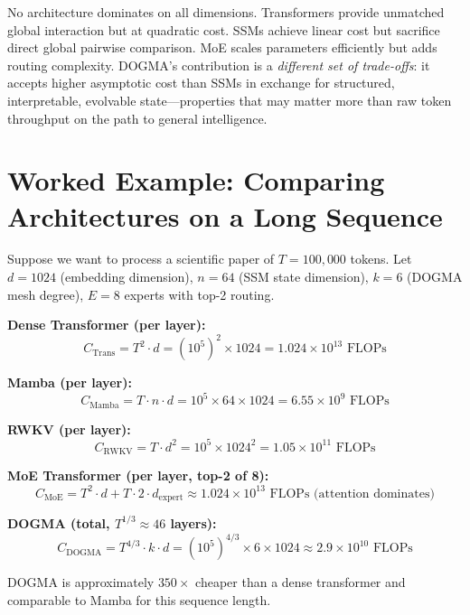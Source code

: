 \begin{keyinsight}
No architecture dominates on all dimensions. Transformers provide unmatched global interaction but at quadratic cost. SSMs achieve linear cost but sacrifice direct global pairwise comparison. MoE scales parameters efficiently but adds routing complexity. DOGMA's contribution is a \emph{different set of trade-offs}: it accepts higher asymptotic cost than SSMs in exchange for structured, interpretable, evolvable state---properties that may matter more than raw token throughput on the path to general intelligence.
\end{keyinsight}

\section{Worked Example: Comparing Architectures on a Long Sequence}
\label{sec:scaling-worked-example}

\begin{example}
Suppose we want to process a scientific paper of $T = 100{,}000$ tokens. Let $d = 1024$ (embedding dimension), $n = 64$ (SSM state dimension), $k = 6$ (DOGMA mesh degree), $E = 8$ experts with top-2 routing.

\textbf{Dense Transformer (per layer):}
\[
C_{\text{Trans}} = T^2 \cdot d = (10^5)^2 \times 1024 = 1.024 \times 10^{13} \text{ FLOPs}
\]

\textbf{Mamba (per layer):}
\[
C_{\text{Mamba}} = T \cdot n \cdot d = 10^5 \times 64 \times 1024 = 6.55 \times 10^9 \text{ FLOPs}
\]

\textbf{RWKV (per layer):}
\[
C_{\text{RWKV}} = T \cdot d^2 = 10^5 \times 1024^2 = 1.05 \times 10^{11} \text{ FLOPs}
\]

\textbf{MoE Transformer (per layer, top-2 of 8):}
\[
C_{\text{MoE}} = T^2 \cdot d + T \cdot 2 \cdot d_{\text{expert}} \approx 1.024 \times 10^{13} \text{ FLOPs (attention dominates)}
\]

\textbf{DOGMA (total, $T^{1/3} \approx 46$ layers):}
\[
C_{\text{DOGMA}} = T^{4/3} \cdot k \cdot d = (10^5)^{4/3} \times 6 \times 1024 \approx 2.9 \times 10^{10} \text{ FLOPs}
\]

DOGMA is approximately $350\times$ cheaper than a dense transformer and comparable to Mamba for this sequence length.
\end{example}

